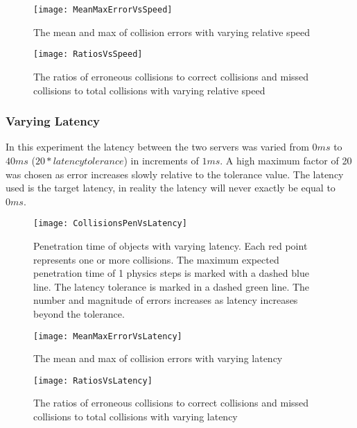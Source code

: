 \begin{figure}[!t]
\centering
\texttt{[image: MeanMaxErrorVsSpeed]}
\caption{The mean and max of collision errors with varying relative speed}
\label{fig_MeanMaxErrorVsSpeed}
\end{figure}

\begin{figure}[!t]
\centering
\texttt{[image: RatiosVsSpeed]}
\caption{The ratios of erroneous collisions to correct collisions and missed collisions to total collisions with varying relative speed}
\label{fig_RatiosVsSpeed}
\end{figure}

\subsubsection{Varying Latency}

In this experiment the latency between the two servers was varied from $0ms$ to $40ms$ ($20*latency tolerance$) in increments of $1ms$. A high maximum factor of 20 was chosen as error increases slowly relative to the tolerance value. The latency used is the target latency, in reality the latency will never exactly be equal to $0ms$.

\begin{figure}[!t]
\centering
\texttt{[image: CollisionsPenVsLatency]}
\caption{Penetration time of objects with varying latency. Each red point represents one or more collisions. The maximum expected penetration time of 1 physics steps is marked with a dashed blue line. The latency tolerance is marked in a dashed green line. The number and magnitude of errors increases as latency increases beyond the tolerance.}
\label{fig_CollisionsPenVsLatency}
\end{figure}

\begin{figure}[!t]
\centering
\texttt{[image: MeanMaxErrorVsLatency]}
\caption{The mean and max of collision errors with varying latency}
\label{fig_MeanMaxErrorVsLatency}
\end{figure}

\begin{figure}[!t]
\centering
\texttt{[image: RatiosVsLatency]}
\caption{The ratios of erroneous collisions to correct collisions and missed collisions to total collisions with varying latency}
\label{fig_RatiosVsLatency}
\end{figure}

